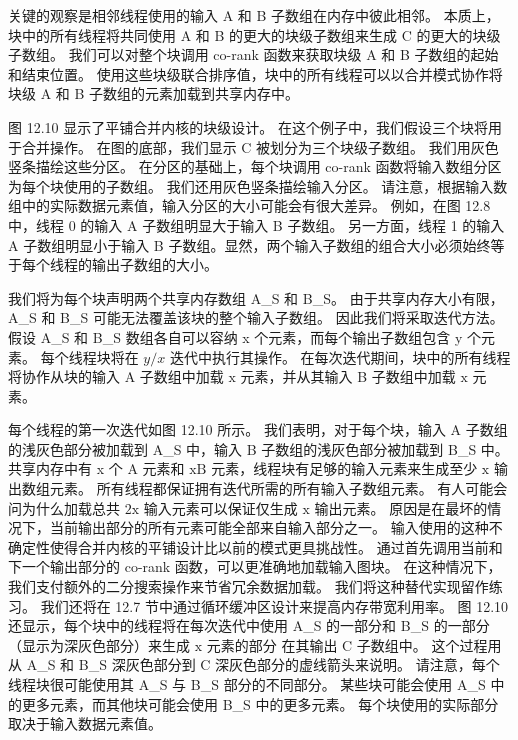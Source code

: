 关键的观察是相邻线程使用的输入 A 和 B 子数组在内存中彼此相邻。 本质上，块中的所有线程将共同使用 A 和 B 的更大的块级子数组来生成 $\mathrm{C}$ 的更大的块级子数组。 我们可以对整个块调用 co-rank 函数来获取块级 A 和 B 子数组的起始和结束位置。 使用这些块级联合排序值，块中的所有线程可以以合并模式协作将块级 A 和 B 子数组的元素加载到共享内存中。

图 12.10 显示了平铺合并内核的块级设计。 在这个例子中，我们假设三个块将用于合并操作。 在图的底部，我们显示 $\mathrm{C}$ 被划分为三个块级子数组。 我们用灰色竖条描绘这些分区。 在分区的基础上，每个块调用 co-rank 函数将输入数组分区为每个块使用的子数组。 我们还用灰色竖条描绘输入分区。 请注意，根据输入数组中的实际数据元素值，输入分区的大小可能会有很大差异。 例如，在图 12.8 中，线程 0 的输入 A 子数组明显大于输入 B 子数组。 另一方面，线程 1 的输入 A 子数组明显小于输入 B 子数组。显然，两个输入子数组的组合大小必须始终等于每个线程的输出子数组的大小。

我们将为每个块声明两个共享内存数组 A\_S 和 B\_S。 由于共享内存大小有限，A\_S 和 B\_S 可能无法覆盖该块的整个输入子数组。 因此我们将采取迭代方法。 假设 A\_S 和 B\_S 数组各自可以容纳 x 个元素，而每个输出子数组包含 y 个元素。 每个线程块将在 $y / x$ 迭代中执行其操作。 在每次迭代期间，块中的所有线程将协作从块的输入 A 子数组中加载 $\mathrm{x}$ 元素，并从其输入 B 子数组中加载 $\mathrm{x}$ 元素。

每个线程的第一次迭代如图 12.10 所示。 我们表明，对于每个块，输入 A 子数组的浅灰色部分被加载到 A\_S 中，输入 B 子数组的浅灰色部分被加载到 B\_S 中。 共享内存中有 x 个 A 元素和 $\mathrm{x} \mathrm{B}$ 元素，线程块有足够的输入元素来生成至少 $\mathrm{x}$ 输出数组元素。 所有线程都保证拥有迭代所需的所有输入子数组元素。 有人可能会问为什么加载总共 $2 \mathrm{x}$ 输入元素可以保证仅生成 $\mathrm{x}$ 输出元素。 原因是在最坏的情况下，当前输出部分的所有元素可能全部来自输入部分之一。 输入使用的这种不确定性使得合并内核的平铺设计比以前的模式更具挑战性。 通过首先调用当前和下一个输出部分的 co-rank 函数，可以更准确地加载输入图块。 在这种情况下，我们支付额外的二分搜索操作来节省冗余数据加载。 我们将这种替代实现留作练习。 我们还将在 12.7 节中通过循环缓冲区设计来提高内存带宽利用率。 图 12.10 还显示，每个块中的线程将在每次迭代中使用 A\_S 的一部分和 B\_S 的一部分（显示为深灰色部分）来生成 $\mathrm{x}$ 元素的部分 在其输出 $\mathrm{C}$ 子数组中。 这个过程用从 A\_S 和 B\_S 深灰色部分到 C 深灰色部分的虚线箭头来说明。 请注意，每个线程块很可能使用其 A\_S 与 B\_S 部分的不同部分。 某些块可能会使用 A\_S 中的更多元素，而其他块可能会使用 B\_S 中的更多元素。 每个块使用的实际部分取决于输入数据元素值。

